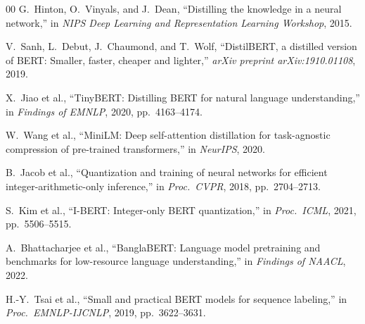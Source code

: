 \documentclass[conference]{IEEEtran}
\begin{document}
\begin{thebibliography}{00}
G.~Hinton, O.~Vinyals, and J.~Dean,
``Distilling the knowledge in a neural network,''
in \textit{NIPS Deep Learning and Representation Learning Workshop}, 2015.

V.~Sanh, L.~Debut, J.~Chaumond, and T.~Wolf,
``DistilBERT, a distilled version of BERT: Smaller, faster, cheaper and lighter,''
\textit{arXiv preprint arXiv:1910.01108}, 2019.

X.~Jiao et al.,
``TinyBERT: Distilling BERT for natural language understanding,''
in \textit{Findings of EMNLP}, 2020, pp.~4163--4174.

W.~Wang et al.,
``MiniLM: Deep self-attention distillation for task-agnostic compression of pre-trained transformers,''
in \textit{NeurIPS}, 2020.

B.~Jacob et al.,
``Quantization and training of neural networks for efficient integer-arithmetic-only inference,''
in \textit{Proc.\ CVPR}, 2018, pp.~2704--2713.

S.~Kim et al.,
``I-BERT: Integer-only BERT quantization,''
in \textit{Proc.\ ICML}, 2021, pp.~5506--5515.

A.~Bhattacharjee et al.,
``BanglaBERT: Language model pretraining and benchmarks for low-resource language understanding,''
in \textit{Findings of NAACL}, 2022.

H.-Y.~Tsai et al.,
``Small and practical BERT models for sequence labeling,''
in \textit{Proc.\ EMNLP-IJCNLP}, 2019, pp.~3622--3631.

\end{thebibliography}
\end{document}
